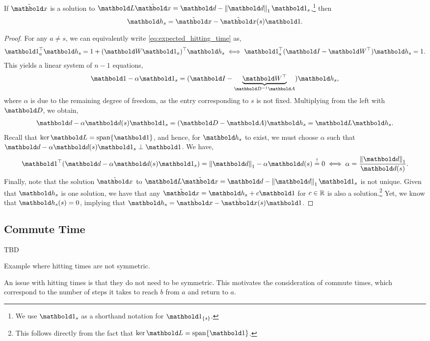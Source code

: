 \begin{lem}
If $\elx$ is a solution to $\mL\elx = \vd - \norm{\vd}_1 \vOne_s$,\footnote{We use $\vOne_s$ as a shorthand notation for $\vOne_{\{s\}}$.} then \begin{align}
    \vh_s = \elx - \elx(s)\vOne.
\end{align}
\end{lem}
\begin{proof}
For any $a \neq s$, we can equivalently write \cref{eq:expected_hitting_time} as, \begin{align*}
    \trans{\vOne_a}\vh_s = 1 + \trans{(\mW \vOne_a)}\vh_s \iff \trans{\vOne_a}(\mI - \trans{\mW})\vh_s = 1.
\end{align*} This yields a linear system of $n-1$ equations, \begin{align}
    \vOne - \alpha \vOne_s = (\mI - \underbrace{\trans{\mW}}_{\inv{\mD}\mA})\vh_s,
\end{align} where $\alpha$ is due to the remaining degree of freedom, as the entry corresponding to $s$ is not fixed. Multiplying from the left with $\mD$, we obtain, \begin{align*}
    \vd - \alpha \vd(s) \vOne_s = (\mD - \mA)\vh_s = \mL\vh_s.
\end{align*} Recall that $\ker{\mL} = \vspan\{\vOne\}$, and hence, for $\vh_s$ to exist, we must choose $\alpha$ such that $\vd - \alpha \vd(s) \vOne_s \perp \vOne$. We have, \begin{align*}
    \trans{\vOne}(\vd - \alpha \vd(s) \vOne_s) = \norm{\vd}_1 - \alpha \vd(s) \overset{!}{=} 0 \iff \alpha = \frac{\norm{\vd}_1}{\vd(s)}.
\end{align*} Finally, note that the solution $\elx$ to $\mL\elx = \vd - \norm{\vd}_1 \vOne_s$ is not unique. Given that $\vh_s$ is one solution, we have that any $\elx = \vh_s + c\vOne$ for $c \in \mathbb{R}$ is also a solution.\footnote{This follows directly from the fact that $\ker{\mL} = \vspan\{\vOne\}$.} Yet, we know that $\vh_s(s) = 0$, implying that $\vh_s = \elx - \elx(s)\vOne$.
\end{proof}

\subsection{Commute Time}

\begin{marginfigure}
TBD
\caption{Example where hitting times are not symmetric.}
\end{marginfigure}
An issue with hitting times is that they do not need to be symmetric. This motivates the consideration of commute times, which correspond to the number of steps it takes to reach $b$ from $a$ and return to $a$.

